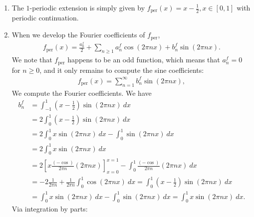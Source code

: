\documentclass[11pt]{article}
\begin{document}
\begin{solution}
    \begin{enumerate}
        \item The $1$-periodic extension is simply given by $f_{\text{per}}(x) = x - \frac 1 2, x \in [0, 1]$ with periodic continuation.
        \item When we develop the Fourier coefficients of $f_{\text{per}}$, 
        \begin{align*}
            f_{\text{per}}(x) = \frac{a^{f}_0}{2} + \sum_{n \geq 1} a^{f}_{n} \cos( 2 \pi n x ) + b^{f}_{n} \sin( 2 \pi n x ).
        \end{align*}
        We note that $f_{\text{per}}$ happens to be an odd function, which means that $a^{f}_n = 0$ for $n \geq 0$,
        and it only remains to compute the sine coefficients:
        \begin{align*}
            f_{\text{per}}(x) = \sum_{n=1}^{\infty} b^{f}_n \sin(2 \pi n x),
        \end{align*}
        We compute the Fourier coefficients. We have 
        \begin{align*}
            b^{f}_n 
            &= 
              \int_{-1}^{1} \left( x- \frac 1 2 \right) \sin(2 \pi n x) \ dx 
            \\&= 
            2 
            \int_{ 0}^{1} \left( x- \frac 1 2 \right) \sin(2 \pi n x) \ dx 
            \\&= 
            2 
            \int_{ 0}^{1} x \sin(2 \pi n x) \ dx 
            - 
            \int_{ 0}^{1} \sin(2 \pi n x) \ dx 
            \\&= 
            2 
            \int_{ 0}^{1} x \sin(2 \pi n x) \ dx 
            \\&= 
            2 
            \left[ x \frac{(-\cos)}{2\pi n}(2 \pi n x) \right]_{x=0}^{x=1}
            -
            \int_{0}^{1} \frac{(-\cos)}{2\pi n}(2 \pi n x) \ dx 
            \\&= 
            -
            2 
            \frac{1}{2\pi n}
            + 
            \frac{1}{2\pi n}
            \int_{0}^{1} \cos(2 \pi n x) \ dx 
            = 
            \int_{0}^{1} \left( x- \frac 1 2 \right) \sin(2 \pi n x) \ dx 
            \\&
            = 
            \int_{0}^{1} x \sin(2 \pi n x) \ dx 
            -
            \int_{0}^{1} \sin(2 \pi n x) \ dx 
            = 
            \int_{0}^{1} x \sin(2 \pi n x) \ dx 
            .
        \end{align*}
        Via integration by parts:

\end{enumerate}
\end{solution}
\end{document}
